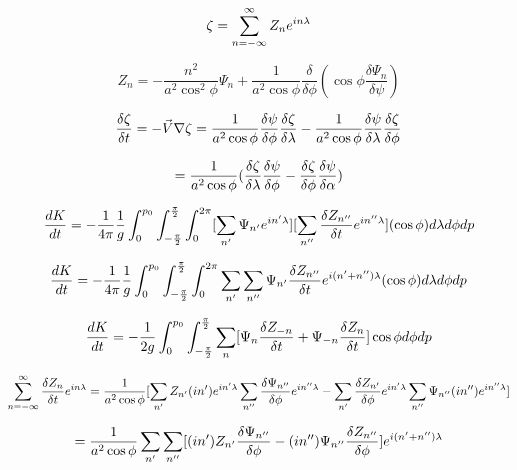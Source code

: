 \documentclass{article}
\begin{document}
\begin{equation}
\zeta = \sum_{n=-\infty}^{\infty} Z_n e^{in\lambda}
\end{equation}

\begin{equation}
Z_n = - \frac{n^2}{a^2 \cos^2{\phi}} \Psi_n + \frac{1}{a^2 \cos{\phi}} \frac{\delta}{\delta \phi} ( \cos{\phi} \frac{\delta \Psi_n}{\delta \psi} )
\end{equation}

\begin{equation}
\frac{\delta \zeta}{\delta t} = - \vec{V} \nabla \zeta = \frac{1}{a^2 \cos{\phi}} \frac{\delta \psi}{\delta \phi} \frac{\delta \zeta}{\delta \lambda} - \frac{1}{a^2 \cos{\phi}} \frac{\delta \psi}{\delta \lambda} \frac{\delta \zeta}{\delta \phi} 
\end{equation}

\begin{equation}
= \frac{1}{a^2 \cos{\phi}} (\frac{\delta \zeta}{\delta \lambda} \frac{\delta \psi}{\delta \phi} - \frac{\delta \zeta}{\delta \phi} \frac{\delta \psi}{\delta \alpha} )
\end{equation}

\begin{equation}
\frac{dK}{dt} = - \frac{1}{4\pi} \frac{1}{g} \int_{0}^{p_0}  \int_{-\frac{\pi}{2}}^{\frac{\pi}{2}} \int_{0}^{2\pi} [ \sum_{n'} \Psi_{n'} e^{in'\lambda} ] [ \sum_{n''} \frac{\delta Z_{n''}}{\delta t} e^{in''\lambda} ] (\cos{\phi}) d\lambda d\phi dp
\end{equation}

\begin{equation}
\frac{dK}{dt} = - \frac{1}{4\pi} \frac{1}{g} \int_{0}^{p_0} \int_{-\frac{\pi}{2}}^{\frac{\pi}{2}} \int_{0}^{2\pi} \sum_{n'} \sum_{n''} \Psi_{n'} \frac{\delta Z_{n''}}{\delta t} e^{i(n'+n'')\lambda} (\cos{\phi}) d\lambda d\phi dp
\end{equation}

\begin{equation}
\frac{dK}{dt} = - \frac{1}{2g} \int_{0}^{p_0} \int_{-\frac{\pi}{2}}^{\frac{\pi}{2}} \sum_n [ \Psi_{n} \frac{\delta Z_{-n}}{\delta t} + \Psi_{-n} \frac{\delta Z_n}{\delta t} ] \cos{\phi} d\phi dp
\end{equation}

\begin{equation}
\sum_{n=-\infty}^{\infty} \frac{\delta Z_n}{\delta t} e^{in\lambda} = \frac{1}{a^2 \cos{\phi}}  [ \sum_{n'}  Z_{n'} (in') e^{in'\lambda} \sum_{n''} \frac{\delta \Psi_{n''}}{\delta \phi} e^{in''\lambda} - \sum_{n'} \frac{\delta Z_{n'}}{\delta \phi} e^{in'\lambda} \sum_{n''} \Psi_{n''} (in'') e^{in''\lambda} ]
\end{equation}

\begin{equation}
= \frac{1}{a^2 \cos{\phi}} \sum_{n'} \sum_{n''} [ (in') Z_{n'} \frac{\delta \Psi_{n''}}{\delta \phi} - (in'') \Psi_{n''} \frac{\delta Z_{n''}}{\delta \phi} ] e^{i(n'+n'')\lambda}
\end{equation}
\end{document}
